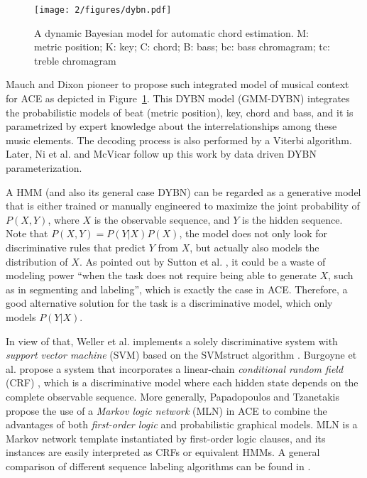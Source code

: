 \begin{figure}[htb]
\centering
\texttt{[image: 2/figures/dybn.pdf]}
\caption{A dynamic Bayesian model for automatic chord estimation. M: metric position; K: key; C: chord; B: bass; bc: bass chromagram; tc: treble chromagram}
\label{fig:2-dybn}
\end{figure}
Mauch and Dixon \cite{mauch2010approximate} pioneer to propose such integrated model of musical context for ACE as depicted in Figure~\ref{fig:2-dybn}. This DYBN model (GMM-DYBN) integrates the probabilistic models of beat (metric position), key, chord and bass, and it is parametrized by expert knowledge about the interrelationships among these music elements. The decoding process is also performed by a Viterbi algorithm. Later, Ni et al. \cite{ni2012end} and McVicar \cite{mcvicar2013machine} follow up this work by data driven DYBN parameterization.

A HMM (and also its general case DYBN) can be regarded as a generative model that is either trained or manually engineered to maximize the joint probability of $P(X,Y)$, where $X$ is the observable sequence, and $Y$ is the hidden sequence. Note that $P(X,Y) = P(Y|X)P(X)$, the model does not only look for discriminative rules that predict $Y$ from $X$, but actually also models the distribution of $X$. As pointed out by Sutton et al. \cite{sutton2007dynamic}, it could be a waste of modeling power ``when the task does not require being able to generate $X$, such as in segmenting and labeling'', which is exactly the case in ACE. Therefore, a good alternative solution for the task is a discriminative model, which only models $P(Y|X)$.

In view of that, Weller et al. \cite{weller2009structured} implements a solely discriminative system with {\it support vector machine} (SVM) \cite{cortes1995support} based on the SVMstruct algorithm \cite{tsochantaridis2005large}. Burgoyne et al. propose a system \cite{burgoyne2007cross} that incorporates a linear-chain {\it conditional random field} (CRF) \cite{lafferty2001conditional}, which is a discriminative model where each hidden state depends on the complete observable sequence. More generally, Papadopoulos and Tzanetakis \cite{papadopoulos2012modeling} propose the use of a {\it Markov logic network} (MLN) \cite{richardson2006markov} in ACE to combine the advantages of both {\it first-order logic} and probabilistic graphical models. MLN is a Markov network template instantiated by first-order logic clauses, and its instances are easily interpreted as CRFs or equivalent HMMs. A general comparison of different sequence labeling algorithms can be found in \cite{nguyen2007comparisons}.

